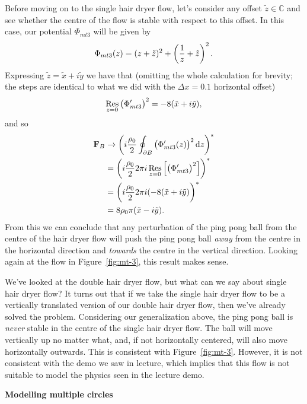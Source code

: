 \documentclass{article}
\DeclareMathOperator*{\res}{Res}
\newcommand{\C}{\mathbb{C}}
\def\*#1{\mathbf{#1}}
\newcommand{\tiz}{\tilde{z}}
\newcommand{\tix}{\tilde{x}}
\newcommand{\tiy}{\tilde{y}}
\begin{document}
Before moving on to the single hair dryer flow, let's consider any offset
$\tiz \in \C$ and see whether the centre of the flow is stable with
respect to this offset. In this case, our potential $\Phi_{mt3}$ will be
given by
%
\begin{equation*}
    \Phi_{mt3}(z) = (z + \tiz)^2 + \del{\frac{1}{z} + \tiz}^2
    .
\end{equation*}
%
Expressing $\tiz = \tix + i \tiy$ we have that (omitting the whole
calculation for brevity; the steps are identical to what we did with the
$\Delta x = 0.1$ horizontal offset)
%
\begin{equation*}
    \res_{z = 0} \del{\Phi^\prime_{mt3}}^2 = -8 (\tix + i \tiy)
    ,
\end{equation*}
%
and so
%
\begin{align*}
    \*F_B
        &\to \del{i \frac{\rho_0}{2} \oint_{\partial B} \del{\Phi_{mt3}^\prime(z)}^2 \dif z}^* \\
        &= \del{i \frac{\rho_0}{2} 2 \pi i \res_{z = 0} \sbr{\del{\Phi^\prime_{mt3}}^2}}^* \\
        &= \del{i \frac{\rho_0}{2} 2 \pi i (- 8 (\tix + i \tiy)}^* \\
        &= 8 \rho_0 \pi (\tix - i \tiy)
    .
\end{align*}
%
From this we can conclude that any perturbation of the ping pong ball
from the centre of the hair dryer flow will push the ping pong ball
\textit{away} from the centre in the horizontal direction and
\textit{towards} the centre in the vertical direction. Looking again at
the flow in Figure~\ref{fig:mt-3}, this result makes sense.

We've looked at the double hair dryer flow, but what can we say about
single hair dryer flow? It turns out that if we take the single hair
dryer flow to be a vertically translated version of our double hair
dryer flow, then we've already solved the problem. Considering our
generalization above, the ping pong ball is \textit{never} stable in the
centre of the single hair dryer flow. The ball will move vertically up
no matter what, and, if not horizontally centered, will also move
horizontally outwards. This is consistent with Figure~\ref{fig:mt-3}.
However, it is not consistent with the demo we saw in lecture, which
implies that this flow is not suitable to model the physics seen in the
lecture demo.

\textbf{Modelling multiple circles}
\end{document}
